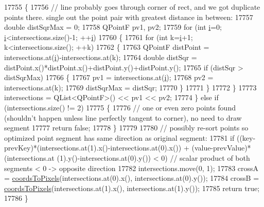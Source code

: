 \begin{DoxyCode}
17755   \{
17756     \textcolor{comment}{// line probably goes through corner of rect, and we got duplicate points there. single out the point
       pair with greatest distance in between:}
17757     \textcolor{keywordtype}{double} distSqrMax = 0;
17758     QPointF pv1, pv2;
17759     \textcolor{keywordflow}{for} (\textcolor{keywordtype}{int} \hyperlink{_comparision_pictures_2_createtest_image_8m_a6f6ccfcf58b31cb6412107d9d5281426}{i}=0; \hyperlink{_comparision_pictures_2_createtest_image_8m_a6f6ccfcf58b31cb6412107d9d5281426}{i}<intersections.size()-1; ++\hyperlink{_comparision_pictures_2_createtest_image_8m_a6f6ccfcf58b31cb6412107d9d5281426}{i})
17760     \{
17761       \textcolor{keywordflow}{for} (\textcolor{keywordtype}{int} k=\hyperlink{_comparision_pictures_2_createtest_image_8m_a6f6ccfcf58b31cb6412107d9d5281426}{i}+1; k<intersections.size(); ++k)
17762       \{
17763         QPointF distPoint = intersections.at(\hyperlink{_comparision_pictures_2_createtest_image_8m_a6f6ccfcf58b31cb6412107d9d5281426}{i})-intersections.at(k);
17764         \textcolor{keywordtype}{double} distSqr = distPoint.x()*distPoint.x()+distPoint.y()+distPoint.y();
17765         \textcolor{keywordflow}{if} (distSqr > distSqrMax)
17766         \{
17767           pv1 = intersections.at(\hyperlink{_comparision_pictures_2_createtest_image_8m_a6f6ccfcf58b31cb6412107d9d5281426}{i});
17768           pv2 = intersections.at(k);
17769           distSqrMax = distSqr;
17770         \}
17771       \}
17772     \}
17773     intersections = QList<QPointF>() << pv1 << pv2;
17774   \} \textcolor{keywordflow}{else} \textcolor{keywordflow}{if} (intersections.size() != 2)
17775   \{
17776     \textcolor{comment}{// one or even zero points found (shouldn't happen unless line perfectly tangent to corner), no need to
       draw segment}
17777     \textcolor{keywordflow}{return} \textcolor{keyword}{false};
17778   \}
17779   
17780   \textcolor{comment}{// possibly re-sort points so optimized point segment has same direction as original segment:}
17781   \textcolor{keywordflow}{if} ((key-prevKey)*(intersections.at(1).x()-intersections.at(0).x()) + (value-prevValue)*(intersections.at
      (1).y()-intersections.at(0).y()) < 0) \textcolor{comment}{// scalar product of both segments < 0 -> opposite direction}
17782     intersections.move(0, 1);
17783   crossA = \hyperlink{class_q_c_p_abstract_plottable_ade710a776104b14c1c835168ce1bfc5c}{coordsToPixels}(intersections.at(0).x(), intersections.at(0).y());
17784   crossB = \hyperlink{class_q_c_p_abstract_plottable_ade710a776104b14c1c835168ce1bfc5c}{coordsToPixels}(intersections.at(1).x(), intersections.at(1).y());
17785   \textcolor{keywordflow}{return} \textcolor{keyword}{true};
17786 \}
\end{DoxyCode}


